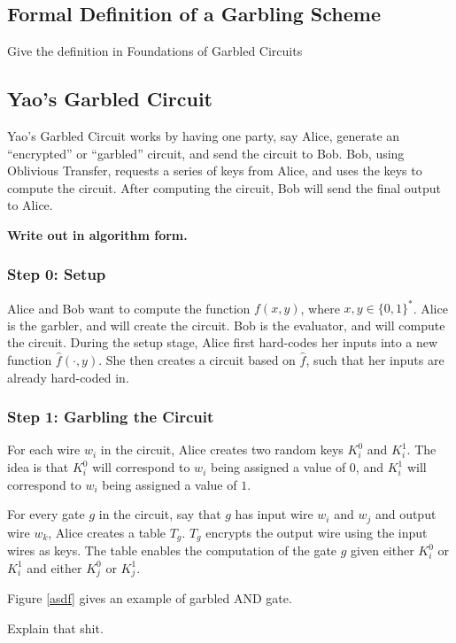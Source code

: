 \documentclass[12pt,twoside]{reedthesis}
\begin{document}
\subsection{Formal Definition of a Garbling Scheme}
Give the definition in Foundations of Garbled Circuits

\subsection{Yao's Garbled Circuit}
Yao's Garbled Circuit works by having one party, say Alice, generate an ``encrypted'' or ``garbled'' circuit, and send the circuit to Bob.
Bob, using Oblivious Transfer, requests a series of keys from Alice, and uses the keys to compute the circuit.
After computing the circuit, Bob will send the final output to Alice. 

\textbf{Write out in algorithm form.}

\subsubsection{Step 0: Setup}
Alice and Bob want to compute the function $f(x,y)$, where $x,y \in \{0,1\}^*$.
Alice is the garbler, and will create the circuit.
Bob is the evaluator, and will compute the circuit.
During the setup stage, Alice first hard-codes her inputs into a new function $\hat{f}(\cdot, y)$.
She then creates a circuit based on $\hat{f}$, such that her inputs are already hard-coded in.

\subsubsection{Step 1: Garbling the Circuit}
For each wire $w_i$ in the circuit, Alice creates two random keys $K^0_i$ and $K^1_i$.
The idea is that $K^0_i$ will correspond to $w_i$ being assigned a value of $0$, and $K^1_i$ will correspond to $w_i$ being assigned a value of $1$.

For every gate $g$ in the circuit, say that $g$ has input wire $w_i$ and $w_j$ and output wire $w_k$, Alice creates a table $T_g$.
$T_g$ encrypts the output wire using the input wires as keys.
The table enables the computation of the gate $g$ given either $K^0_i$ or $K^1_i$ and either $K^0_j$ or $K^1_j$.

Figure \ref{asdf} gives an example of garbled AND gate.

Explain that shit.
\end{document}
